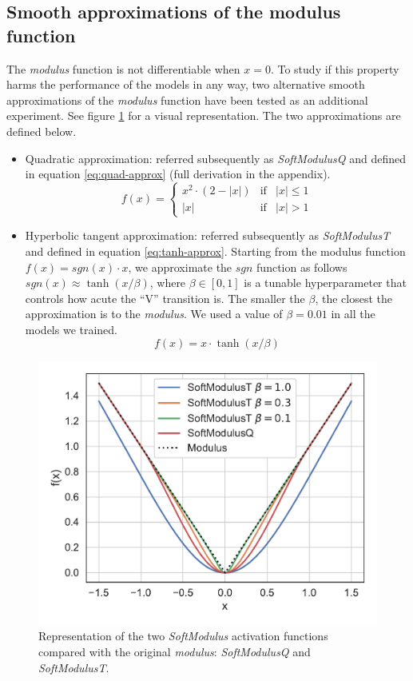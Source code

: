 \documentclass[authoryear]{elsarticle}
\begin{document}
\subsection{Smooth approximations of the modulus function}
The \textit{modulus} function is not differentiable when $x=0$. To study if this property harms the performance of the models in any way, two alternative smooth approximations of the \textit{modulus} function have been tested as an additional experiment. See figure \ref{fig:activationssmooth} for a visual representation. The two approximations are defined below.
\begin{itemize}
	\item Quadratic approximation: referred subsequently as \textit{SoftModulusQ} and defined in equation \ref{eq:quad-approx} (full derivation in the appendix).
	\begin{equation}\label{eq:quad-approx}
	f(x)= \left\{ \begin{array}{lcc}
	x^2 \cdot (2-|x|) &  \text{if} & |x| \leq 1 \\
	|x| &   \text{if}  & |x| > 1
	\end{array}
	\right.
	\end{equation}
	\item Hyperbolic tangent approximation: referred subsequently as \textit{SoftModulusT} and defined in equation \ref{eq:tanh-approx}. Starting from the modulus function $f(x)=sgn(x)\cdot x$, we approximate the $sgn$ function as follows $sgn(x) \approx \tanh(x/\beta)$, where $\beta \in [0, 1]$ is a tunable hyperparameter that controls how acute the ``V'' transition is. The smaller the $\beta$, the closest the approximation is to the \textit{modulus}. We used a value of $\beta=0.01$ in all the models we trained.
	\begin{equation} \label{eq:tanh-approx}
	f(x) = x \cdot \tanh(x/\beta)
	\end{equation}
\end{itemize}

\begin{figure}[h!]
	\centering
	\includegraphics[width=0.65\linewidth]{figs/activations_smooth}
	\caption{Representation of the two \textit{SoftModulus} activation functions compared with the original \textit{modulus}: \textit{SoftModulusQ} and \textit{SoftModulusT}.}
	\label{fig:activationssmooth}
\end{figure}
\end{document}
